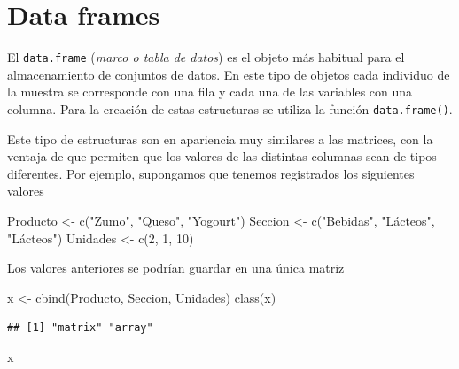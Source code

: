 \documentclass[
]{book}
\newenvironment{Shaded}{\begin{snugshade}}{\end{snugshade}}
\newcommand{\DecValTok}[1]{\textcolor[rgb]{0.00,0.00,0.81}{#1}}
\newcommand{\FunctionTok}[1]{\textcolor[rgb]{0.00,0.00,0.00}{#1}}
\newcommand{\NormalTok}[1]{#1}
\newcommand{\OtherTok}[1]{\textcolor[rgb]{0.56,0.35,0.01}{#1}}
\newcommand{\StringTok}[1]{\textcolor[rgb]{0.31,0.60,0.02}{#1}}
\theoremstyle{break}
\theoremstyle{nonumberplain}
\begin{document}
\hypertarget{data-frames}{%
\section{Data frames}\label{data-frames}}

El \texttt{data.frame} (\emph{marco o tabla de datos}) es el objeto más habitual para el almacenamiento de conjuntos de datos.
En este tipo de objetos cada individuo de la muestra se corresponde con una fila y cada una de las variables con una columna.
Para la creación de estas estructuras se utiliza la función \texttt{data.frame()}.

Este tipo de estructuras son en apariencia muy similares a las matrices, con la ventaja de que permiten que los valores de las distintas columnas sean de tipos diferentes.
Por ejemplo, supongamos que tenemos registrados los siguientes valores

\begin{Shaded}
\begin{Highlighting}[]
\NormalTok{Producto }\OtherTok{\textless{}{-}} \FunctionTok{c}\NormalTok{(}\StringTok{"Zumo"}\NormalTok{, }\StringTok{"Queso"}\NormalTok{, }\StringTok{"Yogourt"}\NormalTok{)}
\NormalTok{Seccion }\OtherTok{\textless{}{-}} \FunctionTok{c}\NormalTok{(}\StringTok{"Bebidas"}\NormalTok{, }\StringTok{"Lácteos"}\NormalTok{, }\StringTok{"Lácteos"}\NormalTok{)}
\NormalTok{Unidades }\OtherTok{\textless{}{-}} \FunctionTok{c}\NormalTok{(}\DecValTok{2}\NormalTok{, }\DecValTok{1}\NormalTok{, }\DecValTok{10}\NormalTok{)}
\end{Highlighting}
\end{Shaded}

Los valores anteriores se podrían guardar en una única matriz

\begin{Shaded}
\begin{Highlighting}[]
\NormalTok{x }\OtherTok{\textless{}{-}} \FunctionTok{cbind}\NormalTok{(Producto, Seccion, Unidades)}
\FunctionTok{class}\NormalTok{(x)}
\end{Highlighting}
\end{Shaded}

\begin{verbatim}
## [1] "matrix" "array"
\end{verbatim}

\begin{Shaded}
\begin{Highlighting}[]
\NormalTok{x}
\end{Highlighting}
\end{Shaded}
\end{document}
